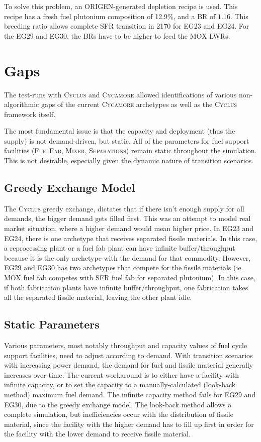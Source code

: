 \documentclass{article}
\newcommand{\Cyclus}{\textsc{Cyclus}\xspace}%
\newcommand{\Cycamore}{\textsc{Cycamore}\xspace}%
\begin{document}
To solve this problem, an ORIGEN-generated depletion recipe is used. This recipe
has a fresh fuel plutonium composition of 12.9\%, and a BR of $1.16$. This breeding
ratio allows complete SFR transition in 2170 for EG23 and EG24. For the EG29 and EG30,
the BRs have to be higher to feed the \gls{MOX} \glspl{LWR}. 


\section{Gaps}
The test-runs with \Cyclus and \Cycamore allowed identifications of various non-algorithmic gaps
of the current \Cycamore archetypes as well as the \Cyclus framework itself. 

The most fundamental issue is that the capacity and deployment (thus the supply) is not
demand-driven, but static. All of the parameters for fuel support facilities (\textsc{FuelFab}\xspace,
\textsc{Mixer}\xspace, \textsc{Separations}\xspace) remain static throughout the simulation.
This is not desirable, especially given the dynamic nature of transition scenarios. 

\subsection{Greedy Exchange Model}
The \Cyclus greedy exchange,
dictates that if there isn't enough supply for all demands, the bigger demand gets filled first.
This was an attempt to model real market situation, where a higher demand would mean higher price. 
In EG23 and EG24,
there is one archetype that receives separated fissile materials. In this case, a reprocessing
plant or a fuel fab plant can have infinite buffer/throughput because it is the only
archetype with the demand for that commodity. However, EG29 and EG30 has two archetypes
that compete for the fissile materials (ie. \gls{MOX} fuel fab competes with \gls{SFR} fuel fab for separated plutonium).
In this case, if both fabrication plants have infinite buffer/throughput, one fabrication takes all the
separated fissile material, leaving the other plant idle.


\subsection{Static Parameters}
Various parameters, most notably throughput and capacity values of fuel cycle support facilities,
need to adjust according to demand. With transition scenarios with increasing power demand, the 
demand for fuel and fissile material generally increases over time. The current workaround is to either
have a facility with infinite capacity, or to set the capacity to a manually-calculated (look-back method)
maximum fuel demand. The infinite capacity method fails for EG29 and EG30, due to the greedy exchange
model. The look-back method allows a complete simulation, but inefficiencies occur with the distribution
of fissile material, since the facility with the higher demand has to fill up first in order for the facility
with the lower demand to receive fissile material. 
\end{document}
